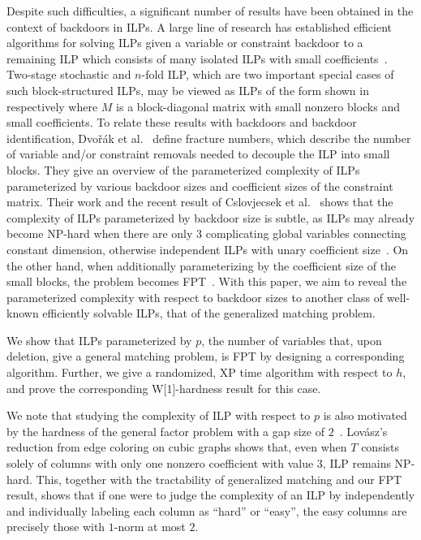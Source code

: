\documentclass[a4paper,UKenglish,cleveref,thm-restate]{lipics-v2021}
\begin{document}
Despite such difficulties, a significant number of results have been obtained in the context of backdoors in ILPs. A large line of research has established efficient algorithms for solving ILPs given a variable or constraint backdoor to a remaining ILP which consists of many isolated ILPs with small coefficients~\cite{DBLP:conf/soda/CslovjecsekKLPP24,DBLP:journals/ai/DvorakEGKO21,eisenbrand2022algorithmictheoryintegerprogramming}. Two-stage stochastic and $n$-fold ILP, which are two important special cases of such block-structured ILPs, may be viewed as ILPs of the form shown in respectively  where $M$ is a block-diagonal matrix with small nonzero blocks and small coefficients. To relate these results with backdoors and backdoor identification, Dvořák et al.~\cite{DBLP:journals/ai/DvorakEGKO21} define fracture numbers, which describe the number of variable and/or constraint removals needed to decouple the ILP into small blocks. They give an overview of the parameterized complexity of ILPs parameterized by various backdoor sizes and coefficient sizes of the constraint matrix. Their work and the recent result of Cslovjecsek et al.~\cite{DBLP:conf/soda/CslovjecsekKLPP24} shows that the complexity of ILPs parameterized by backdoor size is subtle, as ILPs may already become NP-hard when there are only 3 complicating global variables connecting constant dimension, otherwise independent ILPs with unary coefficient size~\cite{DBLP:journals/ai/DvorakEGKO21}. On the other hand, when additionally parameterizing by the coefficient size of the small blocks, the problem becomes FPT~\cite{DBLP:conf/soda/CslovjecsekKLPP24}. With this paper, we aim to reveal the parameterized complexity with respect to backdoor sizes to another class of well-known efficiently solvable ILPs, that of the generalized matching problem.

We show that ILPs parameterized by $p$, the number of variables that, upon deletion, give a general matching problem, is FPT by designing a corresponding algorithm. Further, we give a randomized, XP time algorithm with respect to $h$, and prove the corresponding W[1]-hardness result for this case.

We note that studying the complexity of ILP with respect to $p$ is also motivated by the hardness of the general factor problem with a gap size of $2$~\cite{lovasz1972factorization}. Lovász's reduction from edge coloring on cubic graphs shows that, even when $T$ consists solely of columns with only one nonzero coefficient with value $3$, ILP remains NP-hard. This, together with the tractability of generalized matching and our FPT result, shows that if one were to judge the complexity of an ILP by independently and individually labeling each column as ``hard'' or ``easy'', the easy columns are precisely those with $1$-norm at most $2$.
\end{document}
